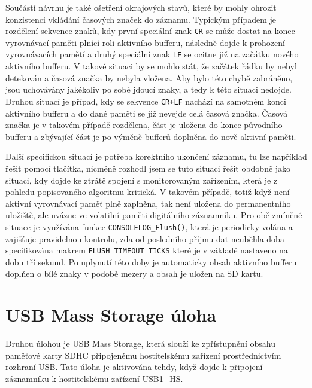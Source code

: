 Součástí návrhu je také ošetření okrajových stavů, které by mohly ohrozit konzistenci vkládání časových značek do záznamu. Typickým případem je rozdělení sekvence znaků, kdy první speciální znak \texttt{CR} se může dostat na konec vyrovnávací paměti plnící roli aktivního bufferu, následně dojde k prohození vyrovnávacích pamětí a druhý speciální znak \texttt{LF} se ocitne již na začátku nového aktivního bufferu. V takové situaci by se mohlo stát, že začátek řádku by nebyl detekován a časová značka by nebyla vložena. Aby bylo této chybě zabráněno, jsou uchovávány jakékoliv po sobě jdoucí znaky, a tedy k této situaci nedojde. Druhou situací je případ, kdy se sekvence \texttt{CR+LF} nachází na samotném konci aktivního bufferu a do dané paměti se již nevejde celá časová značka. Časová značka je v takovém případě rozdělena, část je uložena do konce původního bufferu a zbývající část je po výměně bufferů doplněna do nově aktivní paměti.

Další specifickou situací je potřeba korektního ukončení záznamu, tu lze například řešit pomocí tlačítka, nicméně rozhodl jsem se tuto situaci řešit obdobně jako situaci, kdy dojde ke ztrátě spojení s monitorovaným zařízením, která je z pohledu popisovaného algoritmu kritická. V takovém případě, totiž když není aktivní vyrovnávací paměť plně zaplněna, tak není uložena do permanentního uložiště, ale uvázne ve volatilní paměti digitálního záznamníku. Pro obě zmíněné situace je využívána funkce \texttt{CONSOLELOG\_Flush()},  která je periodicky volána a zajišťuje pravidelnou kontrolu, zda od posledního příjmu dat neuběhla doba specifikována makrem \texttt{FLUSH\_TIMEOUT\_TICKS} které je v základě nastaveno na dobu tří sekund. Po uplynutí této doby je automaticky obsah aktivního bufferu doplňen o bílé znaky v podobě mezery a obsah je uložen na SD kartu.


\section{USB Mass Storage úloha}
Druhou úlohou je USB Mass Storage, která slouží ke zpřístupnění obsahu paměťové karty SDHC připojenému hostitelskému zařízení prostřednictvím rozhraní USB. Tato úloha je aktivována tehdy, když dojde k připojení záznamníku k hostitelskému zařízení USB1\_HS.

